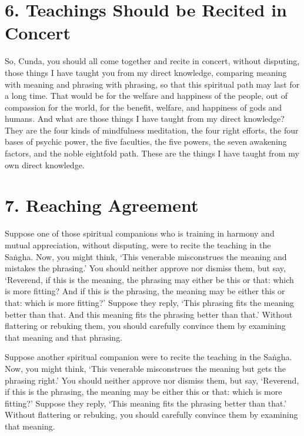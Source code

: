 \documentclass[12pt,openany]{book}%
\begin{document}
\section*{6. Teachings Should be Recited in Concert }

So, Cunda, you should all come together and recite in concert, without disputing, those things I have taught you from my direct knowledge, comparing meaning with meaning and phrasing with phrasing, so that this spiritual path may last for a long time. That would be for the welfare and happiness of the people, out of compassion for the world, for the benefit, welfare, and happiness of gods and humans. And what are those things I have taught from my direct knowledge? They are the four kinds of mindfulness meditation, the four right efforts, the four bases of psychic power, the five faculties, the five powers, the seven awakening factors, and the noble eightfold path. These are the things I have taught from my own direct knowledge. 

\section*{7. Reaching Agreement }

Suppose one of those spiritual companions who is training in harmony and mutual appreciation, without disputing, were to recite the teaching in the \textsanskrit{Saṅgha}. Now, you might think, ‘This venerable misconstrues the meaning and mistakes the phrasing.’ You should neither approve nor dismiss them, but say, ‘Reverend, if this is the meaning, the phrasing may either be this or that: which is more fitting? And if this is the phrasing, the meaning may be either this or that: which is more fitting?’ Suppose they reply, ‘This phrasing fits the meaning better than that. And this meaning fits the phrasing better than that.’ Without flattering or rebuking them, you should carefully convince them by examining that meaning and that phrasing. 

Suppose another spiritual companion were to recite the teaching in the \textsanskrit{Saṅgha}. Now, you might think, ‘This venerable misconstrues the meaning but gets the phrasing right.’ You should neither approve nor dismiss them, but say, ‘Reverend, if this is the phrasing, the meaning may be either this or that: which is more fitting?’ Suppose they reply, ‘This meaning fits the phrasing better than that.’ Without flattering or rebuking, you should carefully convince them by examining that meaning. 
\end{document}
